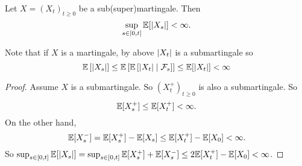 \begin{thm}
    Let $X = (X_t)_{t \geq 0}$ be a sub(super)martingale. Then
    \begin{equation*}
        \sup_{s \in [0,t]} \mathbb{E}[\left\lvert X_s\right\lvert] < \infty.
    \end{equation*}
\end{thm}
\begin{rmk}
    Note that if $X$ is a martingale, by above $\left\lvert X_t\right\lvert$ is a submartingale so
    \begin{equation*}
        \mathbb{E}\left[\left\lvert X_s\right\lvert\right] \leq  \mathbb{E}\left[\mathbb{E}\left[\left\lvert X_t\right\lvert \mid \mathcal{F}_s\right]\right] \leq \mathbb{E}[\left\lvert X_t\right\lvert] < \infty
    \end{equation*}
\end{rmk}
\begin{proof}
    Assume $X$ is a submartingale. So $(X_t^+)_{t \geq 0}$ is also a submartingale. So
    \begin{equation*}
        \mathbb{E}[X_s^+] \leq \mathbb{E}[X_t^+] < \infty.
    \end{equation*}
    On the other hand,
    \begin{equation*}
        \mathbb{E}[X_s^-] = \mathbb{E}[X_s^+] - \mathbb{E}[X_s] \leq \mathbb{E}[X_t^+] - \mathbb{E}[X_0] < \infty.
    \end{equation*}
    So $\sup_{s \in [0,t]}\mathbb{E}[\left\lvert X_s\right\lvert] = \sup_{s \in [0,t]} \mathbb{E}[X_s^+] + \mathbb{E}[X_s^-] \leq 2\mathbb{E}[X_t^+] - \mathbb{E}[X_0] < \infty$.
\end{proof}


